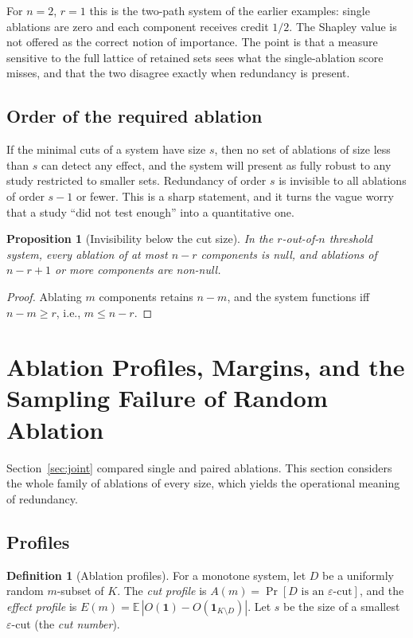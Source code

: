 \documentclass[11pt]{article}
\newtheorem{proposition}[theorem]{Proposition}
\theoremstyle{definition}
\newtheorem{definition}[theorem]{Definition}
\theoremstyle{remark}
\begin{document}
For $n=2$, $r=1$ this is the two-path system of the earlier examples: single ablations are zero and each component receives credit $1/2$. The Shapley value is not offered as the correct notion of importance. The point is that a measure sensitive to the full lattice of retained sets sees what the single-ablation score misses, and that the two disagree exactly when redundancy is present.

\subsection{Order of the required ablation}

If the minimal cuts of a system have size $s$, then no set of ablations of size less than $s$ can detect any effect, and the system will present as fully robust to any study restricted to smaller sets. Redundancy of order $s$ is invisible to all ablations of order $s-1$ or fewer. This is a sharp statement, and it turns the vague worry that a study ``did not test enough'' into a quantitative one.

\begin{proposition}[Invisibility below the cut size]\label{prop:below}
In the $r$-out-of-$n$ threshold system, every ablation of at most $n-r$ components is null, and ablations of $n-r+1$ or more components are non-null.
\end{proposition}
\begin{proof}
Ablating $m$ components retains $n-m$, and the system functions iff $n-m\ge r$, i.e., $m\le n-r$.
\end{proof}


\section{Ablation Profiles, Margins, and the Sampling Failure of Random Ablation}\label{sec:profile}

Section~\ref{sec:joint} compared single and paired ablations. This section considers the whole family of ablations of every size, which yields the operational meaning of redundancy.

\subsection{Profiles}

\begin{definition}[Ablation profiles]
For a monotone system, let $D$ be a uniformly random $m$-subset of $K$. The \emph{cut profile} is $A(m)=\Pr[D\text{ is an }\varepsilon\text{-cut}]$, and the \emph{effect profile} is $E(m)=\mathbb E\,|O(\mathbf 1)-O(\mathbf 1_{K\setminus D})|$. Let $s$ be the size of a smallest $\varepsilon$-cut (the \emph{cut number}).
\end{definition}
\end{document}
